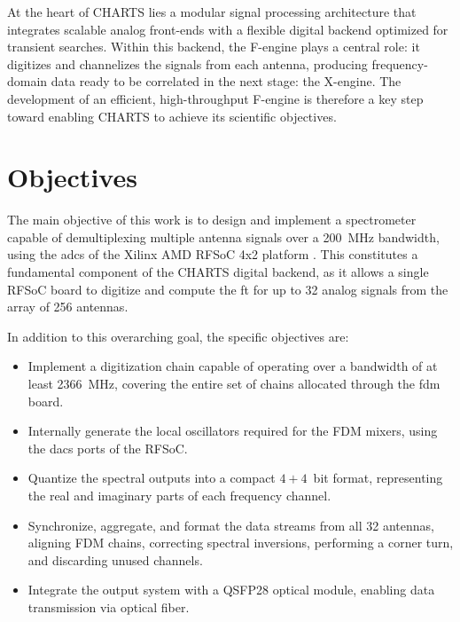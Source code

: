 At the heart of CHARTS lies a modular signal processing architecture that integrates scalable analog front-ends with a flexible digital backend optimized for transient searches. Within this backend, the F-engine plays a central role: it digitizes and channelizes the signals from each antenna, producing frequency-domain data ready to be correlated in the next stage: the X-engine. The development of an efficient, high-throughput F-engine is therefore a key step toward enabling CHARTS to achieve its scientific objectives.

\section{Objectives}
\label{sec:objectives}
The main objective of this work is to design and implement a spectrometer capable of demultiplexing multiple antenna signals over a \SI{200}{\mega\hertz} bandwidth, using the \glspl{adc} of the Xilinx AMD RFSoC 4x2 platform \citep{RealDigital_RFSoC4x2_RefMan_A3}. This constitutes a fundamental component of the CHARTS digital backend, as it allows a single RFSoC board to digitize and compute the \gls{ft} for up to 32 analog signals from the array of 256 antennas.  

In addition to this overarching goal, the specific objectives are:
\begin{itemize}
    \item Implement a digitization chain capable of operating over a bandwidth of at least \SI{2366}{\mega\hertz}, covering the entire set of chains allocated through the \gls{fdm} board.
    \item Internally generate the local oscillators required for the FDM mixers, using the \glspl{dac} ports of the RFSoC.
    \item Quantize the spectral outputs into a compact $4+4$~bit format, representing the real and imaginary parts of each frequency channel.
    \item Synchronize, aggregate, and format the data streams from all 32 antennas, aligning FDM chains, correcting spectral inversions, performing a corner turn, and discarding unused channels.
    \item Integrate the output system with a QSFP28 optical module, enabling data transmission via optical fiber.
\end{itemize}

